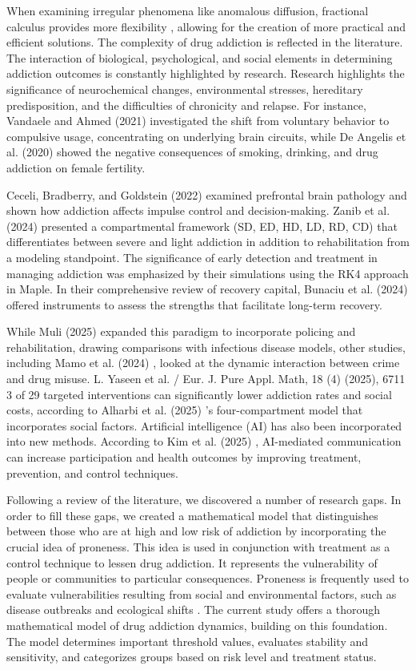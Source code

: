 \documentclass[10pt]{NSP1}
\begin{document}
	When examining irregular phenomena like anomalous diffusion, fractional calculus provides more flexibility \cite{ref13, ref23}, allowing for the creation of more practical and efficient solutions. The complexity of drug addiction is reflected in the literature. The interaction of biological, psychological, and social elements in determining addiction outcomes is constantly highlighted by research. Research highlights the significance of neurochemical changes, environmental stresses, hereditary predisposition, and the difficulties of chronicity and relapse. For instance, Vandaele and Ahmed (2021) investigated the shift from voluntary behavior to compulsive usage, concentrating on underlying brain circuits, while De Angelis et al. (2020) showed the negative consequences of smoking, drinking, and drug addiction on female fertility.
	
	Ceceli, Bradberry, and Goldstein (2022) \cite{ref15} examined prefrontal brain pathology and shown how addiction affects impulse control and decision-making. Zanib et al. (2024) \cite{ref16} presented a compartmental framework (SD, ED, HD, LD, RD, CD) that differentiates between severe and light addiction in addition to rehabilitation from a modeling standpoint. The significance of early detection and treatment in managing addiction was emphasized by their simulations using the RK4 approach in Maple. In their comprehensive review of recovery capital, Bunaciu et al. (2024) \cite{ref17} offered instruments to assess the strengths that facilitate long-term recovery.
	
	While Muli (2025) \cite{ref19} expanded this paradigm to incorporate policing and rehabilitation, drawing comparisons with infectious disease models, other studies, including Mamo et al. (2024) \cite{ref18}, looked at the dynamic interaction between crime and drug misuse. L. Yaseen et al. / Eur. J. Pure Appl. Math, 18 (4) (2025), 6711 3 of 29 targeted interventions can significantly lower addiction rates and social costs, according to Alharbi et al. (2025) \cite{ref20}'s four-compartment model that incorporates social factors. Artificial intelligence (AI) has also been incorporated into new methods. According to Kim et al. (2025) \cite{ref21}, AI-mediated communication can increase participation and health outcomes by improving treatment, prevention, and control techniques.
	
	Following a review of the literature, we discovered a number of research gaps. In order to fill these gaps, we created a mathematical model that distinguishes between those who are at high and low risk of addiction by incorporating the crucial idea of proneness. This idea is used in conjunction with treatment as a control technique to lessen drug addiction. It represents the vulnerability of people or communities to particular consequences. Proneness is frequently used to evaluate vulnerabilities resulting from social and environmental factors, such as disease outbreaks and ecological shifts \cite{ref20, ref21, ref22, ref23, ref24, ref25}. The current study offers a thorough mathematical model of drug addiction dynamics, building on this foundation. The model determines important threshold values, evaluates stability and sensitivity, and categorizes groups based on risk level and treatment status.
	
\end{document}
